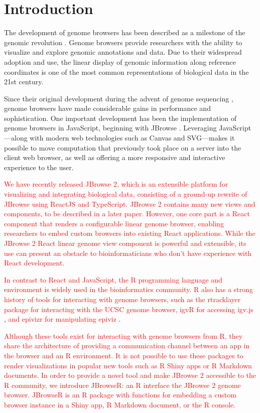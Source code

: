 \documentclass{bioinfo}
\begin{document}
\section{Introduction}

The development of genome browsers has been described as a milestone of
the genomic revolution \citep{packer2007clickable}. Genome browsers
provide researchers with the ability to visualize and explore genomic
annotations and data. Due to their widespread adoption and use, the
linear display of genomic information along reference coordinates is one
of the most common representations of biological data in the 21st
century.

Since their original development during the advent of genome sequencing
\citep{kent2002human, birney2004overview}, genome browsers have made
considerable gains in performance and sophistication. One important
development has been the implementation of genome browsers in
JavaScript, beginning with JBrowse \citep{buels2016jbrowse}. Leveraging
JavaScript---along with modern web technologies such as Canvas and
SVG---makes it possible to move computation that previously took place
on a server into the client web browser, as well as offering a more
responsive and interactive experience to the user.

\textcolor{red}{
We have recently released JBrowse 2, which is an extensible platform for visualizing 
and integrating biological data, consisting of a ground-up rewrite of JBrowse using ReactJS and TypeScript.
JBrowse 2 contains many new views and components, to be described in a later paper.
However, one core part is a React component that renders a configurable
linear genome browser, enabling researchers to embed custom browsers into existing React applications.
While the JBrowse 2 React linear genome view component is powerful and extensible, its use can
present an obstacle to bioinformaticians who don't have experience with React development.}

\textcolor{red}{
In contrast to React and JavaScript, the R programming language and environment is widely used in the 
bioinformatics community. R also has a strong history of tools for interacting with genome browsers,
such as the rtracklayer} \citep{lawrence2009rtracklayer}
\textcolor{red}{package for interacting with the 
UCSC genome browser, igvR for accessing igv.js}
\citep{robinson2011integrative, robinson2017variant},
\textcolor{red}{and epivizr for manipulating epiviz}
\citep{chelaru2014epiviz}.

\textcolor{red}{
Although these tools exist for interacting with genome browsers from R, they share the architecture of
providing a communication channel between an app in the browser and an R environment. It is not possible
to use these packages to render visualizations in popular new tools such as R Shiny apps or R Markdown
documents. In order to provide a novel tool and make JBrowse 2 accessible to the R community, we
introduce JBrowseR: an R interface the JBrowse 2 genome browser. 
JBrowseR is an R package with functions for embedding a custom browser instance in a Shiny app, 
R Markdown document, or the R console.}
\end{document}
